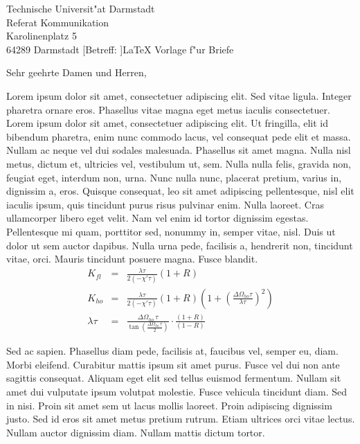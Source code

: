 \documentclass[adr=clemens,accentcolor=tud9c,twoside]{tudletter}
\begin{document}
\begin{letter}{%
    Technische Universit"at Darmstadt\\%
    Referat Kommunikation\\%
    Karolinenplatz 5\\%
    64289 Darmstadt}
  [Betreff: ]{\LaTeX{} Vorlage f"ur Briefe}
  \opening{Sehr geehrte Damen und Herren,}

    Lorem ipsum dolor sit amet, consectetuer adipiscing elit. Sed vitae ligula. Integer pharetra
    ornare eros. Phasellus vitae magna eget metus iaculis consectetuer. Lorem ipsum dolor sit amet,
    consectetuer adipiscing elit. Ut fringilla, elit id bibendum pharetra, enim nunc commodo lacus,
    vel consequat pede elit et massa. Nullam ac neque vel dui sodales malesuada. Phasellus sit amet
    magna. Nulla nisl metus, dictum et, ultricies vel, vestibulum ut, sem. Nulla nulla felis,
    gravida non, feugiat eget, interdum non, urna. Nunc nulla nunc, placerat pretium, varius in,
    dignissim a, eros. Quisque consequat, leo sit amet adipiscing pellentesque, nisl elit iaculis
    ipsum, quis tincidunt purus risus pulvinar enim. Nulla laoreet. Cras ullamcorper libero eget
    velit. Nam vel enim id tortor dignissim egestas. Pellentesque mi quam, porttitor sed, nonummy
    in, semper vitae, nisl. Duis ut dolor ut sem auctor dapibus. Nulla urna pede, facilisis a,
    hendrerit non, tincidunt vitae, orci. Mauris tincidunt posuere magna. Fusce blandit.
      \begin{eqnarray}
        K_{fl}&=&\frac{\lambda\tau}{2(-\chi'\tau)}(1+R)\\
        K_{ho}&=&\frac{\lambda\tau}{2(-\chi'\tau)}(1+R)
          \left(1+\left(\frac{\Delta\Omega_{ho}\tau}{\lambda\tau}\right)^2\right)\\
        \lambda\tau&=&
          \frac{\Delta\Omega_{ho}\,\tau}{\tan\left(\frac{\Delta\Omega_{ho}\,\tau}{2}
            \right)}\cdot\frac{(1+R)}{(1-R)}
      \end{eqnarray}

    Sed ac sapien. Phasellus diam pede, facilisis at, faucibus vel, semper eu, diam. Morbi
    eleifend. Curabitur mattis ipsum sit amet purus. Fusce vel dui non ante sagittis consequat.
    Aliquam eget elit sed tellus euismod fermentum. Nullam sit amet dui vulputate ipsum volutpat
    molestie. Fusce vehicula tincidunt diam. Sed in nisi. Proin sit amet sem ut lacus mollis
    laoreet. Proin adipiscing dignissim justo. Sed id eros sit amet metus pretium rutrum. Etiam
    ultrices orci vitae lectus. Nullam auctor dignissim diam. Nullam mattis dictum tortor.


\end{letter}
\end{document}
